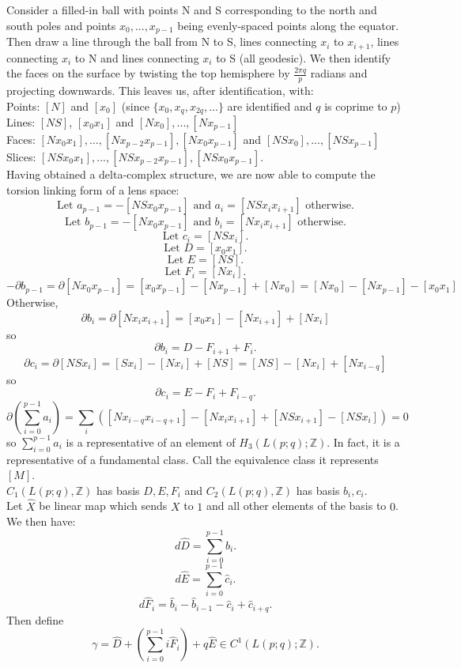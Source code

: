 \documentclass{article}
\begin{document}
\noindent Consider a filled-in ball with points N and S corresponding to the north and south poles and points $x_0,...,x_{p-1}$ being evenly-spaced points along the equator. Then draw a line through the ball from N to S, lines connecting $x_i$ to $x_{i+1}$, lines connecting $x_i$ to N and lines connecting $x_i$ to S (all geodesic). We then identify the faces on the surface by twisting the top hemisphere by $\frac{2\pi q}{p}$ radians and projecting downwards. This leaves us, after identification, with:\\
Points: $[N]$ and $[x_0]$ (since $\{x_0,x_q,x_{2q},...\}$ are identified and $q$ is coprime to $p$)\\
Lines: $[NS]$, $[x_0x_1]$ and $[Nx_0],...,[Nx_{p-1}]$\\
Faces: $[Nx_0x_1],...,[Nx_{p-2}x_{p-1}],[Nx_0x_{p-1}]$ and $[NSx_0],...,[NSx_{p-1}]$\\
Slices: $[NSx_0x_1],...,[NSx_{p-2}x_{p-1}],[NSx_0x_{p-1}]$.\\
Having obtained a delta-complex structure, we are now able to compute the torsion linking form of a lens space:
\[\text{Let }a_{p-1}=-[NSx_0x_{p-1}]\text{ and }a_i=[NSx_ix_{i+1}]\text{ otherwise.}\]
\[\text{Let }b_{p-1}=-[Nx_0x_{p-1}]\text{ and }b_i=[Nx_ix_{i+1}]\text{ otherwise.}\]
\[\text{Let }c_i=[NSx_i].\]
\[\text{Let }D=[x_0x_1].\]
\[\text{Let }E=[NS].\]
\[\text{Let }F_i=[Nx_i].\]
\[-\partial b_{p-1}=\partial[Nx_0x_{p-1}]=[x_0x_{p-1}]-[Nx_{p-1}]+[Nx_0]=[Nx_0]-[Nx_{p-1}]-[x_0x_1]\]
Otherwise, \[\partial b_i=\partial[Nx_ix_{i+1}]=[x_0x_1]-[Nx_{i+1}]+[Nx_i]\]
so \[\partial b_i=D-F_{i+1}+F_i.\]
\[\partial c_i=\partial[NSx_i]=[Sx_i]-[Nx_i]+[NS]=[NS]-[Nx_i]+[Nx_{i-q}]\]
so \[\partial c_i=E-F_i+F_{i-q}.\]
\[\partial(\sum_{i=0}^{p-1}a_i)=\sum_i([Nx_{i-q}x_{i-q+1}]-[Nx_ix_{i+1}]+[NSx_{i+1}]-[NSx_i])=0\] so $\sum_{i=0}^{p-1}a_i$ is a representative of an element of $H_3(L(p;q);\mathbb{Z})$. In fact, it is a representative of a fundamental class. Call the equivalence class it represents $[M]$.\\
$C_1(L(p;q),\mathbb{Z})$ has basis $D,E,F_i$ and $C_2(L(p;q),\mathbb{Z})$ has basis $b_i,c_i$.\\
Let $\widehat X$ be linear map which sends $X$ to $1$ and all other elements of the basis to $0$. We then have:\\
\[d\widehat D=\sum_{i=0}^{p-1}\widehat b_i.\]
\[d\widehat E=\sum_{i=0}^{p-1}\widehat c_i.\]
\[d\widehat F_i=\widehat b_i-\widehat b_{i-1}-\widehat c_i+\widehat c_{i+q}.\]
Then define \[\gamma=\widehat D + (\sum_{i=0}^{p-1}i\widehat F_i)+q\widehat E\in C^1(L(p;q);\mathbb{Z}).\]
\end{document}
